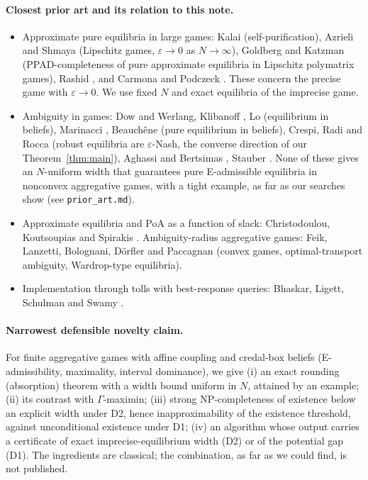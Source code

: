 \documentclass[11pt]{article}
\theoremstyle{definition}
\theoremstyle{remark}
\begin{document}
\paragraph{Closest prior art and its relation to this note.}
\begin{itemize}
\item Approximate pure equilibria in large games: Kalai \cite{Kalai04} (self-purification), Azrieli and Shmaya \cite{AS13} (Lipschitz games, $\varepsilon\to0$ as $N\to\infty$), Goldberg and Katzman \cite{GK23} (PPAD-completeness of pure approximate equilibria in Lipschitz polymatrix games), Rashid \cite{Rashid83}, and Carmona and Podczeck \cite{CP09}. These concern the precise game with $\varepsilon\to0$. We use fixed $N$ and exact equilibria of the imprecise game.
\item Ambiguity in games: Dow and Werlang, Klibanoff \cite{Klibanoff96}, Lo \cite{Lo96} (equilibrium in beliefs), Marinacci \cite{Marinacci00}, Beauchêne \cite{Beauchene16} (pure equilibrium in beliefs), Crespi, Radi and Rocca \cite{CRR20} (robust equilibria are $\varepsilon$-Nash, the converse direction of our Theorem~\ref{thm:main}), Aghassi and Bertsimas \cite{AB06}, Stauber \cite{Stauber11}. None of these gives an $N$-uniform width that guarantees pure E-admissible equilibria in nonconvex aggregative games, with a tight example, as far as our searches show (see \texttt{prior\_art.md}).
\item Approximate equilibria and PoA as a function of slack: Christodoulou, Koutsoupias and Spirakis \cite{CKS11}. Ambiguity-radius aggregative games: Feik, Lanzetti, Bolognani, Dörfler and Paccagnan \cite{Feik26} (convex games, optimal-transport ambiguity, Wardrop-type equilibria).
\item Implementation through tolls with best-response queries: Bhaskar, Ligett, Schulman and Swamy \cite{BLSS19}.
\end{itemize}

\paragraph{Narrowest defensible novelty claim.} For finite aggregative games with affine coupling and credal-box beliefs (E-admissibility, maximality, interval dominance), we give (i) an exact rounding (absorption) theorem with a width bound uniform in $N$, attained by an example; (ii) its contrast with $\Gamma$-maximin; (iii) strong NP-completeness of existence below an explicit width under D2, hence inapproximability of the existence threshold, against unconditional existence under D1; (iv) an algorithm whose output carries a certificate of exact imprecise-equilibrium width (D2) or of the potential gap (D1). The ingredients are classical; the combination, as far as we could find, is not published.
\end{document}

